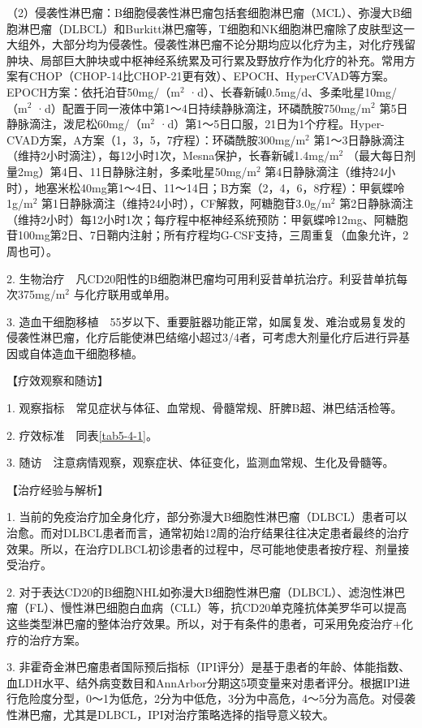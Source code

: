 （2）侵袭性淋巴瘤：B细胞侵袭性淋巴瘤包括套细胞淋巴瘤（MCL）、弥漫大B细胞淋巴瘤（DLBCL）和Burkitt淋巴瘤等，T细胞和NK细胞淋巴瘤除了皮肤型这一大组外，大部分均为侵袭性。侵袭性淋巴瘤不论分期均应以化疗为主，对化疗残留肿块、局部巨大肿块或中枢神经系统累及可行累及野放疗作为化疗的补充。常用方案有CHOP（CHOP-14比CHOP-21更有效）、EPOCH、HyperCVAD等方案。EPOCH方案：依托泊苷50mg/（m$^2$
·d）、长春新碱0.5mg/d、多柔吡星10mg/（m$^2$
·d）配置于同一液体中第1～4日持续静脉滴注，环磷酰胺750mg/m$^2$
第5日静脉滴注，泼尼松60mg/（m$^2$
·d）第1～5日口服，21日为1个疗程。Hyper-CVAD方案，A方案（1，3，5，7疗程）：环磷酰胺300mg/m$^2$
第1～3日静脉滴注（维持2小时滴注），每12小时1次，Mesna保护，长春新碱1.4mg/m$^2$
（最大每日剂量2mg）第4日、11日静脉注射，多柔吡星50mg/m$^2$
第4日静脉滴注（维持24小时），地塞米松40mg第1～4日、11～14日；B方案（2，4，6，8疗程）：甲氨蝶呤1g/m$^2$
第1日静脉滴注（维持24小时），CF解救，阿糖胞苷3.0g/m$^2$
第2日静脉滴注（维持2小时）每12小时1次；每疗程中枢神经系统预防：甲氨蝶呤12mg、阿糖胞苷100mg第2日、7日鞘内注射；所有疗程均G-CSF支持，三周重复（血象允许，2周也可）。

2.
生物治疗　凡CD20阳性的B细胞淋巴瘤均可用利妥昔单抗治疗。利妥昔单抗每次375mg/m$^2$
与化疗联用或单用。

3.
造血干细胞移植　55岁以下、重要脏器功能正常，如属复发、难治或易复发的侵袭性淋巴瘤，化疗后能使淋巴结缩小超过3/4者，可考虑大剂量化疗后进行异基因或自体造血干细胞移植。

【疗效观察和随访】

1. 观察指标　常见症状与体征、血常规、骨髓常规、肝脾B超、淋巴结活检等。

2. 疗效标准　同表\ref{tab5-4-1}。

3. 随访　注意病情观察，观察症状、体征变化，监测血常规、生化及骨髓等。

【治疗经验与解析】

1.
当前的免疫治疗加全身化疗，部分弥漫大B细胞性淋巴瘤（DLBCL）患者可以治愈。而对DLBCL患者而言，通常初始12周的治疗结果往往决定患者最终的治疗效果。所以，在治疗DLBCL初诊患者的过程中，尽可能地使患者按疗程、剂量接受治疗。

2.
对于表达CD20的B细胞NHL如弥漫大B细胞性淋巴瘤（DLBCL）、滤泡性淋巴瘤（FL）、慢性淋巴细胞白血病（CLL）等，抗CD20单克隆抗体美罗华可以提高这些类型淋巴瘤的整体治疗效果。所以，对于有条件的患者，可采用免疫治疗+化疗的治疗方案。

3.
非霍奇金淋巴瘤患者国际预后指标（IPI评分）是基于患者的年龄、体能指数、血LDH水平、结外病变数目和AnnArbor分期这5项变量来对患者评分。根据IPI进行危险度分型，0～1为低危，2分为中低危，3分为中高危，4～5分为高危。对侵袭性淋巴瘤，尤其是DLBCL，IPI对治疗策略选择的指导意义较大。

